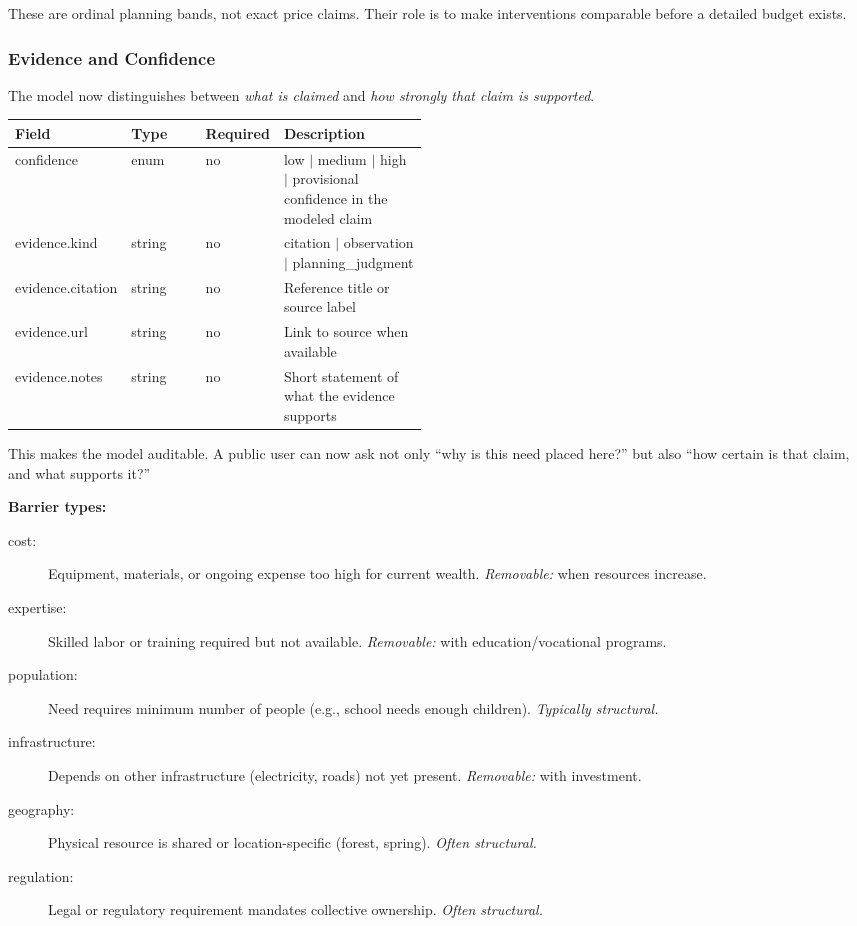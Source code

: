 \documentclass[11pt,a4paper]{article}
\begin{document}
These are ordinal planning bands, not exact price claims. Their role is to make interventions comparable before a detailed budget exists.

\subsubsection{Evidence and Confidence}

The model now distinguishes between \textit{what is claimed} and \textit{how strongly that claim is supported}.

\begin{tabularx}{\linewidth}{>{\raggedright\arraybackslash}p{0.18\linewidth} >{\raggedright\arraybackslash}p{0.18\linewidth} >{\raggedright\arraybackslash}p{0.12\linewidth} >{\raggedright\arraybackslash}X}
\hline
\textbf{Field} & \textbf{Type} & \textbf{Required} & \textbf{Description} \\
\hline
confidence & enum & no & low $|$ medium $|$ high $|$ provisional confidence in the modeled claim \\
evidence.kind & string & no & citation $|$ observation $|$ planning\_judgment \\
evidence.citation & string & no & Reference title or source label \\
evidence.url & string & no & Link to source when available \\
evidence.notes & string & no & Short statement of what the evidence supports \\
\hline
\end{tabularx}

This makes the model auditable. A public user can now ask not only ``why is this need placed here?'' but also ``how certain is that claim, and what supports it?''

\textbf{Barrier types:}
\begin{description}
    \item[cost:] Equipment, materials, or ongoing expense too high for current wealth. \textit{Removable:} when resources increase.
    \item[expertise:] Skilled labor or training required but not available. \textit{Removable:} with education/vocational programs.
    \item[population:] Need requires minimum number of people (e.g., school needs enough children). \textit{Typically structural.}
    \item[infrastructure:] Depends on other infrastructure (electricity, roads) not yet present. \textit{Removable:} with investment.
    \item[geography:] Physical resource is shared or location-specific (forest, spring). \textit{Often structural.}
    \item[regulation:] Legal or regulatory requirement mandates collective ownership. \textit{Often structural.}
\end{description}
\end{document}
